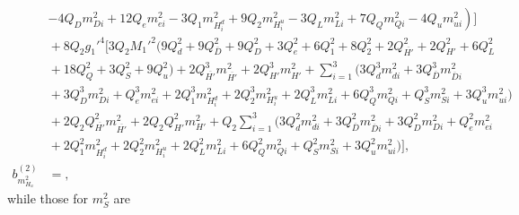 \documentclass[preprint,amsmath,amssymb,aps,superscriptaddress,prd,showpacs,floatfix,nofootinbib]{revtex4-1}
\begin{document}
\begin{subequations}
\begin{align}
&{}\left.-4Q_Dm_{Di}^2+12Q_em_{ei}^2-3Q_1m_{H_i^d}^2+9Q_2m_{H_i^u}^2-3Q_Lm_{Li}^2+7Q_Qm_{Qi}^2-4Q_um_{ui}^2\right )\bigg ]\nonumber\\
&{}+8Q_2g_1'^4\bigg [ 3Q_2M_1'^2\big ( 9Q_d^2+9Q_{\overline{D}}^2+9Q_D^2+3Q_e^2+6Q_1^2+8Q_2^2+2Q_{\overline{H'}}^2+2Q_{H'}^2+6Q_L^2\nonumber\\
&{}+18Q_Q^2+3Q_S^2+9Q_u^2\big )+2Q_{\overline{H'}}^3m_{\overline{H'}}^2+2Q_{H'}^3m_{H'}^2+\sum_{i=1}^3\big ( 3Q_d^3m_{di}^2+3Q_{\overline{D}}^3m_{\overline{D}i}^2\nonumber\\
&{}+3Q_D^3m_{Di}^2+Q_e^3m_{ei}^2+2Q_1^3m_{H_i^d}^2+2Q_2^3m_{H_i^u}^2+2Q_L^3m_{Li}^2+6Q_Q^3m_{Qi}^2+Q_S^3m_{Si}^2+3Q_u^3m_{ui}^2\big )\nonumber\\
&{}+2Q_2Q_{\overline{H'}}^2m_{\overline{H'}}^2+2Q_2Q_{H'}^2m_{H'}^2+Q_2\sum_{i=1}^3\big ( 3Q_d^2m_{di}^2+3Q_{\overline{D}}^2m_{\overline{D}i}^2+3Q_D^2m_{Di}^2+Q_e^2m_{ei}^2\nonumber\\
&{}+2Q_1^2m_{H_i^d}^2+2Q_2^2m_{H_i^u}^2+2Q_L^2m_{Li}^2+6Q_Q^2m_{Qi}^2+Q_S^2m_{Si}^2+3Q_u^2m_{ui}^2\big )\bigg ],\label{eq:USSMmHu2BetaTwoLoop}\\
b_{m_{H_u}^2}^{(2)}&=,\label{eq:USSMmHu2Ot2Coeff}
\end{align}
\end{subequations}
while those for $m_S^2$ are
\end{document}
